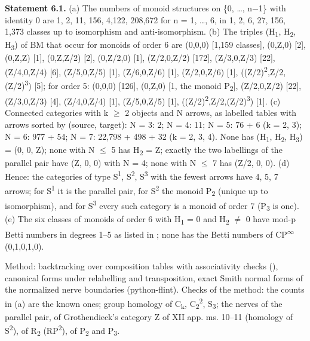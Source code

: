 \textbf{Statement 6.1.} (a) The numbers of monoid structures on \{0, \ldots{}, n\ensuremath{-}1\} with identity 0 are 1, 2, 11, 156, 4,122, 208,672 for n = 1, \ldots{}, 6, in 1, 2, 6, 27, 156, 1,373 classes up to isomorphism and anti-isomorphism. (b) The triples (H\textsubscript{1}, H\textsubscript{2}, H\textsubscript{3}) of BM that occur for monoids of order 6 are (0,0,0) [1,159 classes], (0,Z,0) [2], (0,Z,Z) [1], (0,Z,Z/2) [2], (0,Z/2,0) [1], (Z/2,0,Z/2) [172], (Z/3,0,Z/3) [22], (Z/4,0,Z/4) [6], (Z/5,0,Z/5) [1], (Z/6,0,Z/6) [1], (Z/2,0,Z/6) [1], ((Z/2)\textsuperscript{2},Z/2,(Z/2)\textsuperscript{3}) [5]; for order 5: (0,0,0) [126], (0,Z,0) [1, the monoid P\textsubscript{2}], (Z/2,0,Z/2) [22], (Z/3,0,Z/3) [4], (Z/4,0,Z/4) [1], (Z/5,0,Z/5) [1], ((Z/2)\textsuperscript{2},Z/2,(Z/2)\textsuperscript{3}) [1]. (c) Connected categories with k \ensuremath{\geq} 2 objects and N arrows, as labelled tables with arrows sorted by (source, target): N = 3: 2; N = 4: 11; N = 5: 76 + 6 (k = 2, 3); N = 6: 977 + 54; N = 7: 22,798 + 498 + 32 (k = 2, 3, 4). None has (H\textsubscript{1}, H\textsubscript{2}, H\textsubscript{3}) = (0, 0, Z); none with N \ensuremath{\leq} 5 has H\textsubscript{2} = Z; exactly the two labellings of the parallel pair have (Z, 0, 0) with N = 4; none with N \ensuremath{\leq} 7 has (Z/2, 0, 0). (d) Hence: the categories of type S\textsuperscript{1}, S\textsuperscript{2}, S\textsuperscript{3} with the fewest arrows have 4, 5, 7 arrows; for S\textsuperscript{1} it is the parallel pair, for S\textsuperscript{2} the monoid P\textsubscript{2} (unique up to isomorphism), and for S\textsuperscript{3} every such category is a monoid of order 7 (P\textsubscript{3} is one). (e) The six classes of monoids of order 6 with H\textsubscript{1} = 0 and H\textsubscript{2} \ensuremath{\ne} 0 have mod-p Betti numbers in degrees 1--5 as listed in ; none has the Betti numbers of CP\textsuperscript{\ensuremath{\infty}} (0,1,0,1,0).

Method: backtracking over composition tables with associativity checks (), canonical forms under relabelling and transposition, exact Smith normal forms of the normalized nerve boundaries (python-flint). Checks of the method: the counts in (a) are the known ones; group homology of C\textsubscript{k}, C\textsubscript{2}\textsuperscript{2}, S\textsubscript{3}; the nerves of the parallel pair, of Grothendieck's category Z of XII app. ms. 10--11 (homology of S\textsuperscript{2}), of R\textsubscript{2} (RP\textsuperscript{2}), of P\textsubscript{2} and P\textsubscript{3}.


